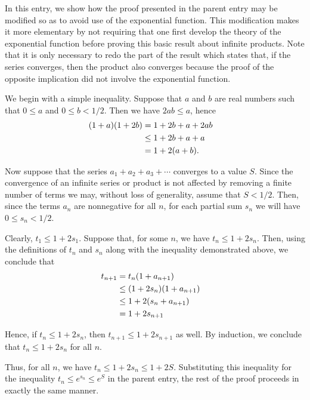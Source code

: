 \documentclass[12pt]{article}
\begin{document}
In this entry, we show how the proof presented in the parent entry
may be modified so as to avoid use of the exponential function.
This modification makes it more elementary by not requiring that
one first develop the theory of the exponential function before
proving this basic result about infinite products.  Note that it
is only necessary to redo the part of the result which states that,
if the series converges, then the product also converges because
the proof of the opposite implication did not involve the exponential
function.

We begin with a simple inequality.  Suppose that $a$ and $b$ are
real numbers such that $0 \le a$ and $0 \le b < 1/2$.  Then we
have $2ab \le a$, hence
\begin{align*}
 (1 + a) (1 + 2 b) &= 1 + 2b + a + 2 a b \cr
                   &\le 1 + 2b + a + a \cr
                   &= 1 + 2 (a + b) .
\end{align*}

Now suppose that the series $a_1 + a_2 + a_3 + \cdots$ converges
to a value $S$. 
Since the convergence of an infinite series or product is not
affected by removing a finite number of terms we may, without
loss of generality, assume that $S < 1/2$.  Then,
since the terms $a_n$ are nonnegative for all $n$, for each partial
sum $s_n$ we will have $0 \le s_n < 1/2$.

Clearly, $t_1 \le 1 + 2 s_1$.  Suppose that, for some $n$, we have
$t_n \le 1 + 2 s_n$.  Then, using the definitions of $t_n$ and
$s_n$ along with the inequality demonstrated above, we conclude that
\begin{align*}
t_{n+1} &= t_n (1 + a_{n+1}) \cr
        &\le (1 + 2 s_n)(1 + a_{n+1}) \cr
        &\le 1 + 2 (s_n + a_{n+1}) \cr 
        &= 1 + 2 s_{n+1}
\end{align*}

Hence, if $t_n \le 1 + 2 s_n$, then
$t_{n+1} \le 1 + 2 s_{n+1}$ as well.  By induction, we conclude that
$t_n \le 1 + 2 s_n$ for all $n$.

Thus, for all $n$, we have $t_n \le 1 + 2 s_n \le 1 + 2S$.  Substituting
this inequality for the inequality $t_n \le e^{s_n} \le e^S$ in the
parent entry, the rest of the proof proceeds in exactly the same manner.
\end{document}
